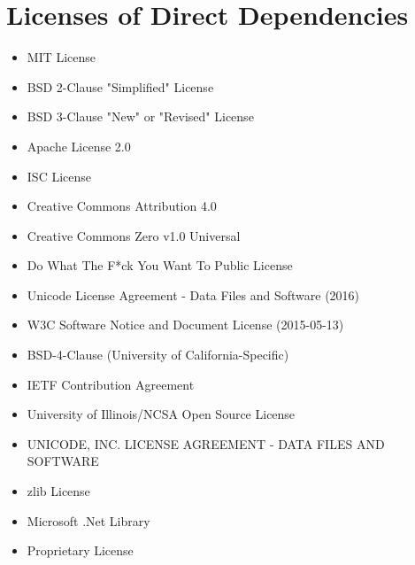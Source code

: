 \section{Licenses of Direct Dependencies} \label{appendix:licenses_Dependencies}
\begin{itemize}
    \item MIT License
    \item BSD 2-Clause "Simplified" License
    \item BSD 3-Clause "New" or "Revised" License
    \item Apache License 2.0
    \item ISC License
    \item Creative Commons Attribution 4.0
    \item Creative Commons Zero v1.0 Universal
    \item Do What The F*ck You Want To Public License
    \item Unicode License Agreement - Data Files and Software (2016)
    \item W3C Software Notice and Document License (2015-05-13)
    \item BSD-4-Clause (University of California-Specific)
    \item IETF Contribution Agreement
    \item University of Illinois/NCSA Open Source License
    \item UNICODE, INC. LICENSE AGREEMENT - DATA FILES AND SOFTWARE
    \item zlib License
    \item Microsoft .Net Library
    \item Proprietary License
\end{itemize}
